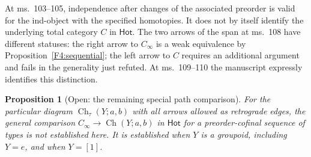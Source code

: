 \documentclass[11pt,a4paper]{article}
\newtheorem{proposition}[theorem]{Proposition}
\theoremstyle{definition}
\theoremstyle{remark}
\begin{document}
At ms.~103--105, independence after changes of the associated
preorder is valid for the ind-object with the specified homotopies.
It does not by itself identify the underlying total category $C$ in
$\mathsf{Hot}$.  The two arrows of the span at ms.~108 have different
statuses: the right arrow to $C_\infty$ is a weak equivalence by
Proposition~\ref{F4:sequential}; the left arrow to $C$ requires an
additional argument and fails in the generality just refuted.
At ms.~109--110 the manuscript expressly identifies this distinction.

\begin{proposition}[Open: the remaining special path comparison]
\label{F4:path-comparison-open}
For the particular diagram $\operatorname{Ch}_\tau(Y;a,b)$ with all
arrows allowed as retrograde edges, the general comparison
$C_\infty\to\operatorname{Ch}(Y;a,b)$ in $\mathsf{Hot}$ for a
preorder-cofinal sequence of types is not established here.  It is
established when $Y$ is a groupoid, including $Y=e$, and when $Y=[1]$.
\end{proposition}
\end{document}
